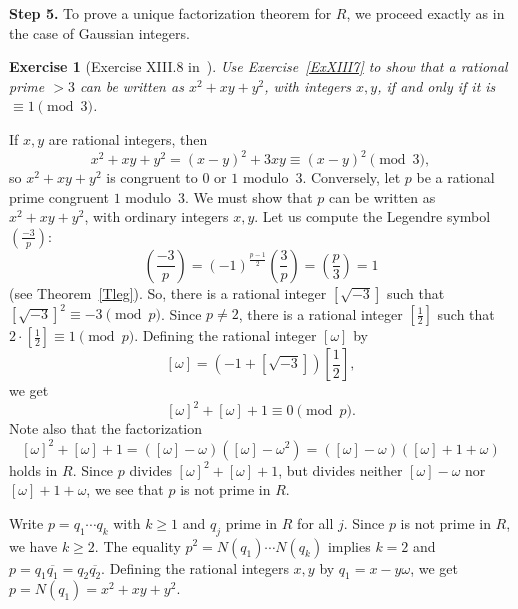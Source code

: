 \documentclass[12pt,letterpaper]{article}
\newtheorem{exer}[thm]{Exercise}
\theoremstyle{definition}
\begin{document}
\noindent\textbf{Step 5.} To prove a unique factorization theorem for $R$, we proceed exactly as in the case of Gaussian integers. 

\begin{exer}[Exercise XIII.8 in~\cite{weil1979}]
Use Exercise~\ref{ExXIII7} to show that a rational prime $>3$ can be written as $x^2+xy+y^2$, with integers $x,y$, if and only if it is $\equiv 1\pmod 3$.
\end{exer}

If $x,y$ are rational integers, then 
$$
x^2+xy+y^2=(x-y)^2+3xy\equiv(x-y)^2\pmod{3},
$$ 
so $x^2+xy+y^2$ is congruent to $0$ or $1$ modulo~$3$. Conversely, let $p$ be a rational prime congruent $1$ modulo~$3$. We must show that $p$ can be written as $x^2+xy+y^2$, with ordinary integers $x,y$. Let us compute the Legendre symbol $(\frac{-3}{p})$: 
$$
\left(\frac{-3}{p}\right)=(-1)^{\frac{p-1}{2}}\left(\frac{3}{p}\right)=\left(\frac{p}{3}\right)=1
$$ 
(see Theorem~\ref{Tleg}). So, there is a rational integer $[\sqrt{-3}]$ such that $[\sqrt{-3}]^2 \equiv-3\pmod{p}$. Since $p\ne2$, there is a rational integer $[\frac{1}{2}]$ such that $2\cdot[\frac{1}{2}]\equiv1\pmod{p}$. Defining the rational integer $[\omega]$ by 
$$
[\omega]=(-1+[\sqrt{-3}])\left[\frac{1}{2}\right],
$$ 
we get 
$$
[\omega]^2+[\omega]+1\equiv0\pmod{p}.
$$ 
Note also that the factorization 
$$
[\omega]^2+[\omega]+1=([\omega]-\omega)([\omega]-\omega^2)=([\omega]-\omega)([\omega]+1+\omega)
$$ 
holds in $R$. Since $p$ divides $[\omega]^2+[\omega]+1$, but divides neither $[\omega]-\omega$ nor $[\omega]+1+\omega$, we see that $p$ is not prime in $R$. 

Write $p=q_1\cdots q_k$ with $k\ge1$ and $q_j$ prime in $R$ for all $j$. Since $p$ is not prime in $R$, we have $k\ge2$. The equality $p^2=N(q_1)\cdots N(q_k)$ implies $k=2$ and $p=q_1\overline{q_1}=q_2\overline{q_2}$. Defining the rational integers $x,y$ by $q_1=x-y\omega$, we get $p=N(q_1)=x^2+xy+y^2$. 

\printbibliography

\printindex
\end{document}
